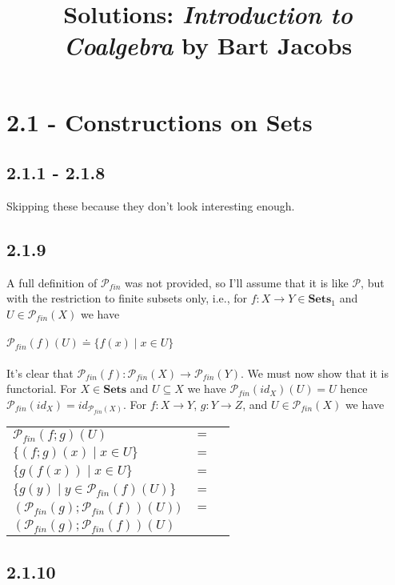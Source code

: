 \documentclass{article}
\title{Solutions: \emph{Introduction to Coalgebra} by Bart Jacobs }
\newcommand{\mbf}{\mathbf}
\begin{document}
\maketitle

\section*{2.1 - Constructions on Sets}

\subsection*{2.1.1 - 2.1.8}

Skipping these because they don't look interesting enough.

\subsection*{2.1.9}

A full definition of $\mathcal P_{fin}$ was not provided, so I'll assume that it is like $\mathcal P$,
but with the restriction to finite subsets only, i.e., for $f : X \to Y \in \mbf{Sets}_1$ and 
$U \in \mathcal P_{fin}(X)$ we have \\~\\
$\mathcal P_{fin}(f)(U) \doteq \{ f(x) \mid x \in U \}$\\~\\
It's clear that $\mathcal P_{fin}(f) : \mathcal P_{fin}(X) \to \mathcal P_{fin}(Y)$. We must now show that it is
functorial. For $X \in \mbf{Sets}$ and $U \subseteq X$ we have $\mathcal P_{fin}(id_X)(U) = U$ hence 
$\mathcal P_{fin}(id_X) = id_{\mathcal P_{fin}(X)}$. For $f : X \to Y$, $g : Y \to Z$, and
$U \in \mathcal P_{fin}(X)$ we have 
\begin{center}
\begin{tabular}{lll}
$\mathcal P_{fin}(f;g)(U)$ & $=$ & \\
$\{ (f;g)(x) \mid x \in U \}$ & $=$ & \\
$\{ g(f(x)) \mid x \in U \}$ & $=$ & \\
$\{ g(y) \mid y \in \mathcal P_{fin}(f)(U) \}$ & $=$ & \\
$(\mathcal P_{fin}(g);\mathcal P_{fin}(f))(U))$ & $=$ & \\
$(\mathcal P_{fin}(g);\mathcal P_{fin}(f))(U)$ &  &
\end{tabular}
\end{center}

\subsection*{2.1.10}
\end{document}
